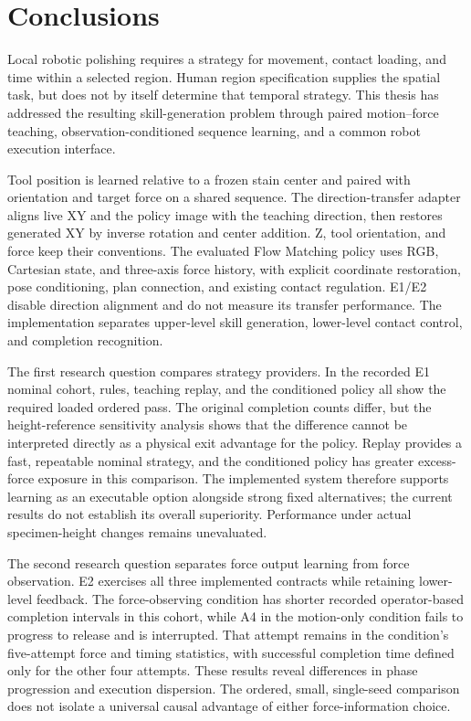 \chapter{Conclusions}
\label{chap:conclusions}

Local robotic polishing requires a strategy for movement, contact loading, and time within a selected region. Human region specification supplies the spatial task, but does not by itself determine that temporal strategy. This thesis has addressed the resulting skill-generation problem through paired motion--force teaching, observation-conditioned sequence learning, and a common robot execution interface.

Tool position is learned relative to a frozen stain center and paired with orientation and target force on a shared sequence. The direction-transfer adapter aligns live XY and the policy image with the teaching direction, then restores generated XY by inverse rotation and center addition. Z, tool orientation, and force keep their conventions. The evaluated Flow Matching policy uses RGB, Cartesian state, and three-axis force history, with explicit coordinate restoration, pose conditioning, plan connection, and existing contact regulation. E1/E2 disable direction alignment and do not measure its transfer performance. The implementation separates upper-level skill generation, lower-level contact control, and completion recognition.

The first research question compares strategy providers. In the recorded E1 nominal cohort, rules, teaching replay, and the conditioned policy all show the required loaded ordered pass. The original completion counts differ, but the height-reference sensitivity analysis shows that the difference cannot be interpreted directly as a physical exit advantage for the policy. Replay provides a fast, repeatable nominal strategy, and the conditioned policy has greater excess-force exposure in this comparison. The implemented system therefore supports learning as an executable option alongside strong fixed alternatives; the current results do not establish its overall superiority. Performance under actual specimen-height changes remains unevaluated.

The second research question separates force output learning from force observation. E2 exercises all three implemented contracts while retaining lower-level feedback. The force-observing condition has shorter recorded operator-based completion intervals in this cohort, while A4 in the motion-only condition fails to progress to release and is interrupted. That attempt remains in the condition's five-attempt force and timing statistics, with successful completion time defined only for the other four attempts. These results reveal differences in phase progression and execution dispersion. The ordered, small, single-seed comparison does not isolate a universal causal advantage of either force-information choice.


